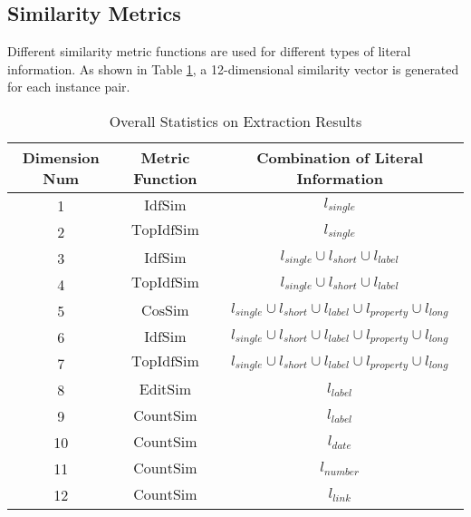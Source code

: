 \subsection{Similarity Metrics}
\label{sec:metric}
Different similarity metric functions are used for different types of literal information. As shown in Table \ref{tab:metric}, a 12-dimensional similarity vector is generated for each instance pair.
\begin{table}[t]
\caption{Overall Statistics on Extraction Results}
\label{tab:metric}
\centering
\begin{tabular}{c|c|c}
  \toprule
  Dimension Num & Metric Function & Combination of Literal Information\\
  \midrule
    1 & $\mathrm{IdfSim}$ & $l_{single}$ \\
    2 & $\mathrm{TopIdfSim}$ & $l_{single}$ \\
    3 & $\mathrm{IdfSim}$ & $l_{single}\cup l_{short} \cup l_{label}$ \\
    4 & $\mathrm{TopIdfSim}$ & $l_{single}\cup l_{short} \cup l_{label}$ \\
    5 & $\mathrm{CosSim}$ & $l_{single}\cup l_{short} \cup l_{label} \cup l_{property} \cup l_{long}$ \\
    6 & $\mathrm{IdfSim}$ & $l_{single}\cup l_{short} \cup l_{label} \cup l_{property} \cup l_{long}$ \\
    7 & $\mathrm{TopIdfSim}$ & $l_{single}\cup l_{short} \cup l_{label} \cup l_{property} \cup l_{long}$ \\
    8 & $\mathrm{EditSim}$ & $l_{label}$ \\
    9 & $\mathrm{CountSim}$ & $l_{label}$ \\
    10 & $\mathrm{CountSim}$ & $l_{date}$ \\
    11 & $\mathrm{CountSim}$ & $l_{number}$ \\
    12 & $\mathrm{CountSim}$ & $l_{link}$ \\
  \bottomrule
\end{tabular}
\end{table}

